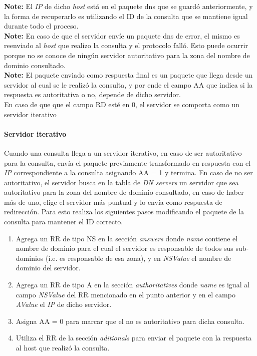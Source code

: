 \documentclass[10pt,a4paper]{article}
\begin{document}
\textbf{Note:} El \textit{IP} de dicho \textit{host} está en el paquete dns que se guardó anteriormente, y la forma de recuperarlo es utilizando el ID de la consulta que se mantiene igual durante todo el proceso. \\

\textbf{Note:} En caso de que el servidor envíe un paquete dns de error, el mismo es reenviado al \textit{host} que realizo la consulta y el protocolo falló. Esto puede ocurrir porque no se conoce de ningún servidor autoritativo para la zona del nombre de dominio consultado. \\

\textbf{Note:} El paquete enviado como respuesta final es un paquete que llega desde un servidor al cual se le realizó la consulta, y por ende el campo AA que indica si la respuesta es autoritativa o no, depende de dicho servidor. \\

En caso de que que el campo RD esté en 0, el servidor se comporta como un servidor iterativo \\

\paragraph{Servidor iterativo}

Cuando una consulta llega a un servidor iterativo, en caso de ser autoritativo para la consulta, envía el paquete previamente transformado en respuesta con el \textit{IP} correspondiente a la consulta asignando AA = 1 y termina. En caso de no ser autoritativo, el servidor busca en la tabla de \textit{DN servers} un servidor que sea autoritativo para la zona del nombre de dominio consultado, en caso de haber más de uno, elige el servidor más puntual y lo envía como respuesta de redirección. Para esto realiza los siguientes pasos modificando el paquete de la consulta para mantener el ID correcto.

\begin{enumerate}
\item Agrega un RR de tipo NS en la sección \textit{answers} donde \textit{name} contiene el nombre de dominio para el cual el servidor es responsable de todos sus sub-dominios (i.e. es responsable de esa zona), y en \textit{NSValue} el nombre de dominio del servidor.
\item Agrega un RR de tipo A en la sección \textit{authoritatives} donde \textit{name} es igual al campo \textit{NSValue} del RR mencionado en el punto anterior y en el campo \textit{AValue} el \textit{IP} de dicho servidor.
\item Asigna AA = 0 para marcar que el no es autoritativo para dicha consulta.
\item Utiliza el RR de la sección \textit{aditionals} para enviar el paquete con la respuesta al host que realizó la consulta.
\end{enumerate}
\end{document}
